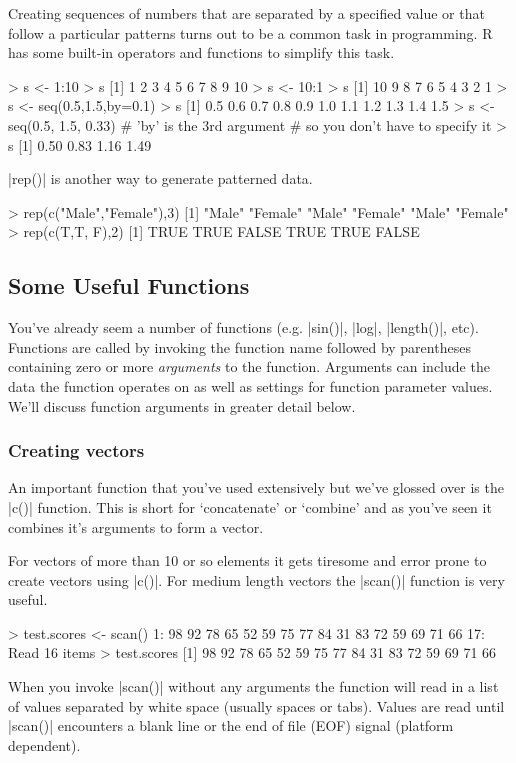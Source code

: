 Creating sequences of numbers that are separated by a specified value or
that follow a particular patterns turns out to be a common task in
programming. R has some built-in operators and functions to simplify
this task.
%
\begin{R}
> s <- 1:10
> s
 [1]  1  2  3  4  5  6  7  8  9 10
> s <- 10:1
> s
 [1] 10  9  8  7  6  5  4  3  2  1
> s <- seq(0.5,1.5,by=0.1)
> s
 [1] 0.5 0.6 0.7 0.8 0.9 1.0 1.1 1.2 1.3 1.4 1.5
> s <- seq(0.5, 1.5, 0.33) # 'by' is the 3rd argument
                           # so you don't have to specify it
> s
[1] 0.50 0.83 1.16 1.49 
\end{R}

|rep()| is another way to generate patterned data.
%
\begin{R}
> rep(c("Male","Female"),3)
[1] "Male"   "Female" "Male"   "Female" "Male"   "Female"
> rep(c(T,T, F),2)
[1]  TRUE  TRUE FALSE  TRUE  TRUE FALSE
\end{R}


\subsection{Some Useful Functions}

You've already seem a number of functions (e.g. |sin()|,
|log|, |length()|, etc). Functions are called by
invoking the function name followed by parentheses containing zero or
more \emph{arguments} to the function. Arguments can include the data
the function operates on as well as settings for function parameter
values. We'll discuss function arguments in greater detail below.

\subsubsection{Creating vectors}

An important function that you've used extensively but we've glossed
over is the |c()| function. This is short for `concatenate' or
`combine' and as you've seen it combines it's arguments to form a
vector.

For vectors of more than 10 or so elements it gets tiresome and error
prone to create vectors using |c()|. For medium length vectors
the |scan()| function is very useful.
%
\begin{R}
> test.scores <- scan()
1: 98 92 78 65 52 59 75 77 84 31 83 72 59 69 71 66 
17: 
Read 16 items
> test.scores
 [1] 98 92 78 65 52 59 75 77 84 31 83 72 59 69 71 66
\end{R}
%
When you invoke |scan()| without any arguments the function
will read in a list of values separated by white space (usually spaces
or tabs). Values are read until |scan()| encounters a blank
line or the end of file (EOF) signal (platform dependent).

